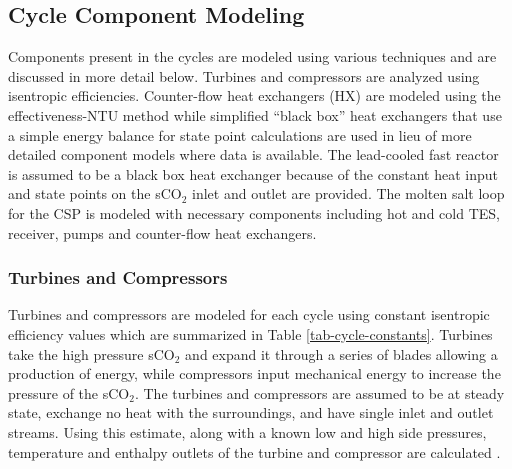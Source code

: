



\subsection{Cycle Component Modeling}
Components present in the cycles are modeled using various techniques and are discussed in more detail below. Turbines and compressors are analyzed using isentropic efficiencies. Counter-flow heat exchangers (HX) are modeled using the effectiveness-NTU method while simplified ``black box'' heat exchangers that use a simple energy balance for state point calculations are used in lieu of more detailed component models where data is available. The lead-cooled fast reactor is assumed to be a black box heat exchanger because of the constant heat input and state points on the sCO$_2$ inlet and outlet are provided. The molten salt loop for the CSP is modeled with necessary components including hot and cold TES, receiver, pumps and counter-flow heat exchangers.



\subsubsection{Turbines and Compressors }

Turbines and compressors are modeled for each cycle using constant isentropic efficiency values which are summarized in Table \ref{tab-cycle-constants}. Turbines take the high pressure sCO$_2$ and expand it through a series of blades allowing a production of energy, while compressors input mechanical energy to increase the pressure of the sCO$_2$. The turbines and compressors are assumed to be at steady state, exchange no heat with the surroundings, and have single inlet and outlet streams. Using this estimate, along with a known low and high side pressures, temperature and enthalpy outlets of the turbine and compressor are calculated \cite{klein_nellis_2011}. 

